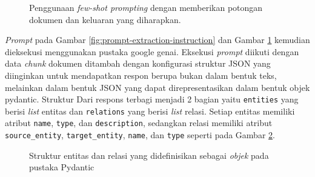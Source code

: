 \begin{figure}[H]
	\centering
	\caption{
		Penggunaan \textit{few-shot prompting} dengan memberikan potongan dokumen dan keluaran yang diharapkan.
	}
	\label{fig:prompt-extraction-few-shot}
\end{figure}

\textit{Prompt} pada Gambar \ref{fig:prompt-extraction-instruction} dan Gambar \ref{fig:prompt-extraction-few-shot} kemudian dieksekusi menggunakan pustaka google genai.
Eksekusi \textit{prompt} diikuti dengan data \textit{chunk} dokumen ditambah dengan konfigurasi struktur JSON yang diinginkan untuk mendapatkan respon berupa bukan dalam bentuk teks, melainkan dalam bentuk JSON yang dapat direpresentasikan dalam bentuk objek pydantic.
Struktur Dari respons terbagi menjadi 2 bagian yaitu \texttt{entities} yang berisi \textit{list} entitas dan \texttt{relations} yang berisi \textit{list} relasi.
Setiap entitas memiliki atribut \texttt{name}, \texttt{type}, dan \texttt{description}, sedangkan relasi memiliki atribut \texttt{source\_entity}, \texttt{target\_entity}, \texttt{name}, dan \texttt{type} seperti pada Gambar \ref{fig:entity-relation-structure}.

\begin{figure}[H]
	\centering
	\caption{
		Struktur entitas dan relasi yang didefinisikan sebagai \textit{objek} pada pustaka Pydantic
	}
	\label{fig:entity-relation-structure}
\end{figure}

